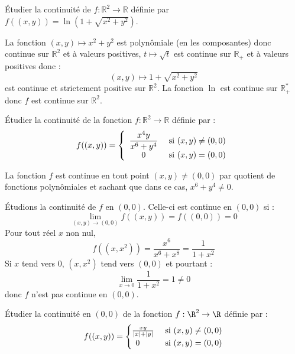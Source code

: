 \documentclass[a4paper,10pt]{report}
\begin{document}
\begin{Exa} Étudier la continuité de $f : \mathbb{R}^2 \rightarrow \mathbb{R}$ définie par $f((x,y))= \ln(1 + \sqrt{x^2+y^2})$.
\end{Exa}

\corr La fonction $(x,y) \mapsto x^2+y^2$ est polynômiale (en les composantes) donc continue sur $\mathbb{R}^2$ et à valeurs positives, $t \mapsto \sqrt{t}$ est continue sur $\mathbb{R}_+$ et à valeurs positives donc :
$$ (x,y) \mapsto 1+ \sqrt{x^2+y^2}$$
est continue et strictement positive sur $\mathbb{R}^2$. La fonction $\ln$ est continue sur $\mathbb{R}_+^{*}$ donc $f$ est continue sur $\mathbb{R}^2$.

\begin{Exa} Étudier la continuité de la fonction $f : \mathbb{R}^2 \rightarrow \mathbb{R}$ définie par :
$$ f((x,y)) = \left\lbrace \begin{array}{cl}
\dfrac{x^4 y}{x^6+y^4} & \hbox{ si } (x,y) \neq (0,0) \\
0 & \hbox{ si } (x,y)=(0,0) \\
\end{array}\right.$$
\end{Exa}

\corr La fonction $f$ est continue en tout point $(x,y) \neq (0,0)$ par quotient de fonctions polynômiales et sachant que dans ce cas, $x^6+y^4 \neq 0$. 

\medskip

\noindent Étudions la continuité de $f$ en $(0,0)$. Celle-ci est continue en $(0,0)$ si :
$$ \lim_{(x,y) \rightarrow (0,0)} f((x,y)) =f((0,0))= 0$$
Pour tout réel $x$ non nul,
$$ f((x,x^2)) = \dfrac{x^6}{x^6+x^8} = \dfrac{1}{1+x^2}$$
Si $x$ tend vers $0$, $(x,x^2)$ tend vers $(0,0)$ et pourtant :
$$ \lim_{x \rightarrow 0} \dfrac{1}{1+x^2} = 1 \neq 0$$
donc $f$ n'est pas continue en $(0,0)$.

\begin{Exa} Étudier la continuité en $(0,0)$ de la fonction $f : \R^{2} \rightarrow \R$ définie par :
  \[
  f((x,y)) =
  \begin{cases}
    \frac{xy}{\vert x \vert + \vert y \vert} & \hbox{ si } (x,y) \neq (0,0) \\
    \, \; 0 & \hbox{ si } (x,y)=(0,0)
  \end{cases}
  \]
\end{Exa}
\end{document}
